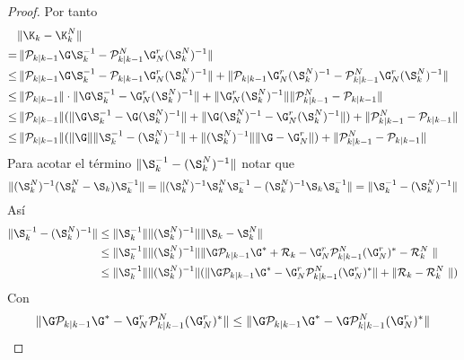 \begin{proof}
	Por tanto
	\begin{equation*}
		\begin{aligned}
			& \| \K_k - \K_k^N  \| \\
			= & \, \| \mathcal{P}_{k|k-1} \G
			\S_k^{-1} - \mathcal{P}_{k|k-1}^N \G_N^r
			(\S_k^N)^{-1} \| \\
			\leq & \, \| \mathcal{P}_{k|k-1} \G
			\S_k^{-1} - \mathcal{P}_{k|k-1}\G_N^r
			(\S_k^N)^{-1}  \| + \|  \mathcal{P}_{k|k-1}\G_N^r
			(\S_k^N)^{-1} - \mathcal{P}_{k|k-1}^N \G_N^r
			(\S_k^N)^{-1}  \| \\
			\leq & \, \|  \mathcal{P}_{k|k-1} \| \cdot \| \G
			\S_k^{-1} - \G_N^r
			(\S_k^N)^{-1} \| + \|\G_N^r
			(\S_k^N)^{-1} \|  \|  \mathcal{P}_{k|k-1}^N -  \mathcal{P}_{k|k-1} \| \\
			\leq & \, \|  \mathcal{P}_{k|k-1} \| ( \| \G
			\S_k^{-1} - \G (\S_k^N)^{-1} \| + \|\G (\S_k^N)^{-1}  - \G_N^r
			(\S_k^N)^{-1} \| ) + \|  \mathcal{P}_{k|k-1}^N -  \mathcal{P}_{k|k-1} \| \\
			\leq & \, \|  \mathcal{P}_{k|k-1} \| ( \| \G \| \| \S_k^{-1} - (\S_k^N)^{-1} \| + \|(\S_k^N)^{-1} \| \|\G  - \G_N^r \| ) + \|  \mathcal{P}_{k|k-1}^N -  \mathcal{P}_{k|k-1} \|
		\end{aligned}		
	\end{equation*}
	Para acotar el término $\| \S_k^{-1} - (\S_k^N)^{-1} \| $ notar que
	\begin{equation*}
	  \|  (\S_k^N)^{-1} (\S_k^N - \S_k) \S_k^{-1}  \| = \|  (\S_k^N)^{-1} \S_k^N \S_k^{-1} - (\S_k^N)^{-1} \S_k \S_k^{-1}  \|  =\|  \S_k^{-1} - (\S_k^N)^{-1} \|
	\end{equation*}
	Así
	\begin{equation*}
		\begin{aligned}
			 \|  \S_k^{-1} - (\S_k^N)^{-1} \|  & \leq \| \S_k^{-1} \| \| (\S_k^N)^{-1} \| \|  \S_k - \S_k^N \| \\
			 & \leq \| \S_k^{-1} \| \| (\S_k^N)^{-1} \|   \| \G \mathcal{P}_{k|k-1} \G^* + \mathcal{R}_k - \G_N^r \mathcal{P}^N_{k|k-1} (\G^r_N)^* - \mathcal{R}_k^N \| \\
			 & \leq \| \S_k^{-1} \| \| (\S_k^N)^{-1} \|  (  \| \G \mathcal{P}_{k|k-1} \G^* - \G_N^r \mathcal{P}^N_{k|k-1} (\G^r_N)^* \| + \| \mathcal{R}_k - \mathcal{R}_k^N \| ) 
		\end{aligned}
	\end{equation*}
	Con 
	\begin{equation*}
		\begin{aligned}
			 \| \G \mathcal{P}_{k|k-1} \G^* - \G_N^r \mathcal{P}^N_{k|k-1} (\G^r_N)^* \| & \leq \|  \G \mathcal{P}_{k|k-1} \G^* - \G \mathcal{P}^N_{k|k-1} (\G^r_N)^* \| \\

\end{aligned}
\end{equation*}
\end{proof}
